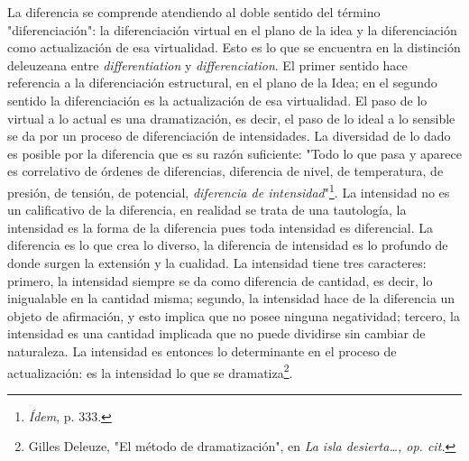 \documentclass{book}
\begin{document}
La diferencia se comprende atendiendo al doble sentido del término
"diferenciación": la diferenciación virtual en el plano de la idea y la
diferenciación como actualización de esa virtualidad. Esto es lo que se
encuentra en la distinción deleuzeana entre \emph{differentiation} y
\emph{differenciation}. El primer sentido hace referencia a la
diferenciación estructural, en el plano de la Idea; en el segundo
sentido la diferenciación es la actualización de esa virtualidad. El
paso de lo virtual a lo actual es una dramatización, es decir, el paso
de lo ideal a lo sensible se da por un proceso de diferenciación de
intensidades. La diversidad de lo dado es posible por la diferencia que
es su razón suficiente: "Todo lo que pasa y aparece es correlativo de
órdenes de diferencias, diferencia de nivel, de temperatura, de presión,
de tensión, de potencial, \emph{diferencia de intensidad}"\footnote{\emph{Ídem},
  p. 333.}. La intensidad no es un calificativo de la diferencia, en
realidad se trata de una tautología, la intensidad es la forma de la
diferencia pues toda intensidad es diferencial. La diferencia es lo que
crea lo diverso, la diferencia de intensidad es lo profundo de donde
surgen la extensión y la cualidad. La intensidad tiene tres caracteres:
primero, la intensidad siempre se da como diferencia de cantidad, es
decir, lo inigualable en la cantidad misma; segundo, la intensidad hace
de la diferencia un objeto de afirmación, y esto implica que no posee
ninguna negatividad; tercero, la intensidad es una cantidad implicada
que no puede dividirse sin cambiar de naturaleza. La intensidad es
entonces lo determinante en el proceso de actualización: es la
intensidad lo que se dramatiza\footnote{Gilles Deleuze, "El método de
  dramatización", en \emph{La isla desierta\ldots, op. cit.}}.
\end{document}
